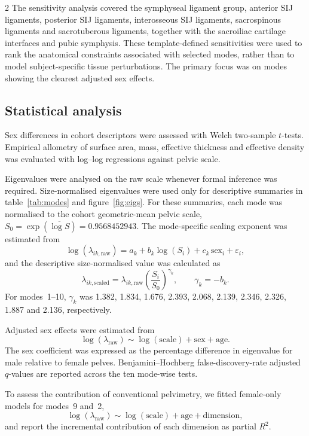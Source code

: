 \documentclass[openacc]{rsproca_new}
\begin{document}
\begin{multicols}{2}
The sensitivity analysis covered the symphyseal ligament group, anterior SIJ ligaments, posterior SIJ ligaments, interosseous SIJ ligaments, sacrospinous ligaments and sacrotuberous ligaments, together with the sacroiliac cartilage interfaces and pubic symphysis. These template-defined sensitivities were used to rank the anatomical constraints associated with selected modes, rather than to model subject-specific tissue perturbations. The primary focus was on modes showing the clearest adjusted sex effects.

\subsection{Statistical analysis}

Sex differences in cohort descriptors were assessed with Welch two-sample $t$-tests. Empirical allometry of surface area, mass, effective thickness and effective density was evaluated with log--log regressions against pelvic scale.

Eigenvalues were analysed on the raw scale whenever formal inference was required. Size-normalised eigenvalues were used only for descriptive summaries in table~\ref{tab:modes} and figure~\ref{fig:eigs}. For these summaries, each mode was normalised to the cohort geometric-mean pelvic scale, $S_0=\exp(\overline{\log S})=0.9568452943$. The mode-specific scaling exponent was estimated from
\begin{equation}
\log(\lambda_{ik,\mathrm{raw}})=a_k+b_k\log(S_i)+c_k\,\mathrm{sex}_i+\varepsilon_i,
\end{equation}
and the descriptive size-normalised value was calculated as
\begin{equation}
\lambda_{ik,\mathrm{scaled}}=\lambda_{ik,\mathrm{raw}}\left(\frac{S_i}{S_0}\right)^{\gamma_k},
\qquad \gamma_k=-b_k.
\end{equation}
For modes~1--10, $\gamma_k$ was 1.382, 1.834, 1.676, 2.393, 2.068, 2.139, 2.346, 2.326, 1.887 and 2.136, respectively.

Adjusted sex effects were estimated from
\begin{equation}
\log(\lambda_{\mathrm{raw}}) \sim \log(\mathrm{scale}) + \mathrm{sex} + \mathrm{age}.
\end{equation}
The sex coefficient was expressed as the percentage difference in eigenvalue for male relative to female pelves. Benjamini--Hochberg false-discovery-rate adjusted $q$-values are reported across the ten mode-wise tests.

To assess the contribution of conventional pelvimetry, we fitted female-only models for modes~9 and~2,
\begin{equation}
\log(\lambda_{\mathrm{raw}}) \sim \log(\mathrm{scale}) + \mathrm{age} + \mathrm{dimension},
\end{equation}
and report the incremental contribution of each dimension as partial $R^2$.


\end{multicols}
\end{document}
